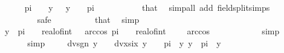\begin{isabellebody}
\ \ \ \ \ \ \isamarkupfalse%
\ {\isachardoublequoteopen}pi\ {\isacharless}{\kern0pt}\ {}\ {\isacharslash}{\kern0pt}\ y{\isachardoublequoteclose}\ {\isachardoublequoteopen}{}\ {\isacharslash}{\kern0pt}\ y\ {\isacharless}{\kern0pt}\ {}\ {\isacharasterisk}{\kern0pt}\ pi{\isachardoublequoteclose}\ \isanewline
\ \ \ \ \ \ \ \ \isamarkupfalse%
\ that\ \isamarkupfalse%
\ {\isacharparenleft}{\kern0pt}simp{\isacharunderscore}{\kern0pt}all\ add{\isacharcolon}{\kern0pt}\ field{\isacharunderscore}{\kern0pt}split{\isacharunderscore}{\kern0pt}simps{\isacharparenright}{\kern0pt}\isanewline
\ \ \ \ \ \ \ \ \ \isamarkupfalse%
\ safe\isanewline
\ \ \ \ \ \ \ \ \isamarkupfalse%
\ that\ \isamarkupfalse%
\ simp{\isacharplus}{\kern0pt}\isanewline
\ \ \ \ \ \ \isamarkupfalse%
\ \isamarkupfalse%
\ {\isachardoublequoteopen}{}\ {\isacharslash}{\kern0pt}\ y\ {\isasymin}\ {\isacharbraceleft}{\kern0pt}pi\ {\isacharasterisk}{\kern0pt}\ {\isacharparenleft}{\kern0pt}{}\ {\isacharasterisk}{\kern0pt}\ real{\isacharunderscore}{\kern0pt}of{\isacharunderscore}{\kern0pt}int\ {}{\isacharparenright}{\kern0pt}\ {\isacharplus}{\kern0pt}\ arccos\ {}{\isacharless}{\kern0pt}{\isachardot}{\kern0pt}{\isachardot}{\kern0pt}{\isacharless}{\kern0pt}pi\ {\isacharasterisk}{\kern0pt}\ {\isacharparenleft}{\kern0pt}{}\ {\isacharasterisk}{\kern0pt}\ {\isacharparenleft}{\kern0pt}real{\isacharunderscore}{\kern0pt}of{\isacharunderscore}{\kern0pt}int\ {}\ {\isacharplus}{\kern0pt}\ {}{\isacharparenright}{\kern0pt}{\isacharparenright}{\kern0pt}\ {\isacharminus}{\kern0pt}\ arccos\ {}{\isacharbraceright}{\kern0pt}{\isachardoublequoteclose}\ \isanewline
\ \ \ \ \ \ \ \ \isamarkupfalse%
\ simp\isanewline
\ \ \ \ \isamarkupfalse%
\isanewline
\ \ \isamarkupfalse%
\ simp\isanewline
\isanewline
\ \ \isamarkupfalse%
\ {\isacharasterisk}{\kern0pt}{\isacharcolon}{\kern0pt}\ {\isachardoublequoteopen}dvsgn\ {\isacharparenleft}{\kern0pt}{}{\isacharslash}{\kern0pt}y{\isacharparenright}{\kern0pt}\ {\isasymge}\ {}\ {\isasymlongleftrightarrow}\ dvxsix\ y\ {\isasymle}\ {}{\isachardoublequoteclose}\ \ {\isachardoublequoteopen}{}{\isacharslash}{\kern0pt}{\isacharparenleft}{\kern0pt}{}{\isacharasterisk}{\kern0pt}pi{\isacharparenright}{\kern0pt}\ {\isacharless}{\kern0pt}\ y{\isachardoublequoteclose}\ {\isachardoublequoteopen}y\ {\isacharless}{\kern0pt}\ {}{\isacharslash}{\kern0pt}pi{\isachardoublequoteclose}\ \ y\isanewline

\end{isabellebody}
